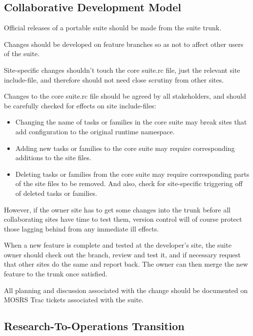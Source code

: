 \subsection{Collaborative Development Model}
\label{Collaborative Development Model}

Official releases of a portable suite should be made from the suite trunk.

Changes should be developed on feature branches so as not to affect other users
of the suite.

Site-specific changes shouldn't touch the core suite.rc file, just the relevant
site include-file, and therefore should not need close scrutiny from other
sites.

Changes to the core suite.rc file should be agreed by all stakeholders, and
should be carefully checked for effects on site include-files:

\begin{itemize}
  \item Changing the name of tasks or families in the core suite may break
    sites that add configuration to the original runtime namespace.
  \item Adding new tasks or families to the core suite may require
    corresponding additions to the site files.
  \item Deleting tasks or families from the core suite may require
    corresponding parts of the site files to be removed. And also, check for
    site-specific triggering off of deleted tasks or families.
\end{itemize}

However, if the owner site has to get some changes into the trunk before all
collaborating sites have time to test them, version control will of course
protect those lagging behind from any immediate ill effects.

When a new feature is complete and tested at the developer's site, the suite
owner should check out the branch, review and test it, and if necessary request
that other sites do the same and report back. The owner can then merge the
new feature to the trunk once satisfied.

All planning and discussion associated with the change should be documented on
MOSRS Trac tickets associated with the suite.

\subsection{Research-To-Operations Transition}

